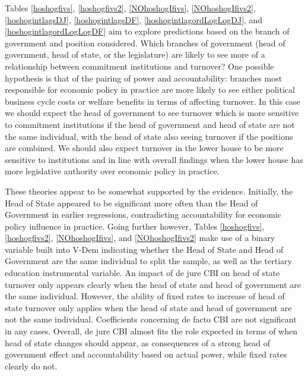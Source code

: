 \documentclass{article}
\begin{document}
    Tables \ref{hoshogfivs}, \ref{hoshogfivs2}, \ref{NOhoshogIfivs}, \ref{NOhoshogIfivs2}, \ref{hoshogintlagsDJ}, \ref{hoshogintlagsDF}, \ref{hoshogintlagordLogLogDJ}, and \ref{hoshogintlagordLogLogDF} aim to explore predictions based on the branch of government and position considered. Which branches of government (head of government, head of state, or the legislature) are likely to see more of a relationship between commitment institutions and turnover? One possible hypothesis is that of the pairing of power and accountability: branches most responsible for economic policy in practice are more likely to see either political business cycle costs or welfare benefits in terms of affecting turnover. In this case we should expect the head of government to see turnover which is more sensitive to commitment institutions if the head of government and head of state are not the same individual, with the head of state also seeing turnover if the positions are combined. We should also expect turnover in the lower house to be more sensitive to institutions and in line with overall findings when the lower house has more legislative authority over economic policy in practice.

    These theories appear to be somewhat supported by the evidence. Initially, the Head of State appeared to be significant more often than the Head of Government in earlier regressions, contradicting accountability for economic policy influence in practice. Going further however, Tables \ref{hoshogfivs}, \ref{hoshogfivs2}, \ref{NOhoshogIfivs}, and \ref{NOhoshogIfivs2} make use of a binary variable built into V-Dem indicating whether the Head of State and Head of Government are the same individual to split the sample, as well as the tertiary education instrumental variable.  An impact of de jure CBI on head of state turnover only appears clearly when the head of state and head of government are the same individual. However, the ability of fixed rates to increase of head of state turnover only applies when the head of state and head of government are not the same individual. Coefficients concerning de facto CBI are not significant in any cases. Overall, de jure CBI almost fits the role expected in terms of when head of state changes should appear, as consequences of a strong head of government effect and accountability based on actual power, while fixed rates clearly do not. 
\end{document}
